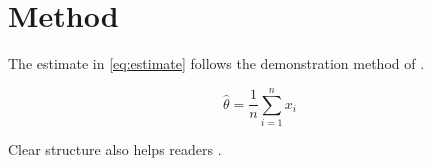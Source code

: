 \documentclass{article}
\begin{document}
\section{Method}
\label{sec:method}
The estimate in \cref{eq:estimate} follows the demonstration method of
\textcite{example2026}.

\begin{equation}
  \hat{\theta}=\frac{1}{n}\sum_{i=1}^{n}x_i
  \label{eq:estimate}
\end{equation}

Clear structure also helps readers \parencite{writing2025}.

\printbibliography
\end{document}
